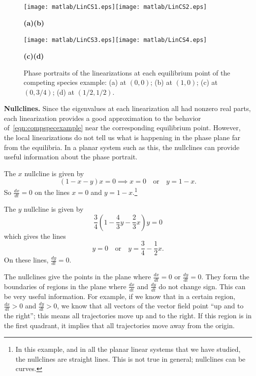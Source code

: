 \documentclass[reqno]{immbook}
\numberwithin{equation}{chapter}
\numberwithin{question}{section}
\numberwithin{theorem}{chapter}
\numberwithin{figure}{chapter}
\theoremstyle{definition}
\begin{document}

\begin{figure}
\centerline{\texttt{[image: matlab/LinCS1.eps]}\texttt{[image: matlab/LinCS2.eps]}}
\vspace{-0.2in}
\centerline{\hspace{0.2in}\textbf{(a)}\hspace{2.1in}\textbf{(b)}}
\centerline{\texttt{[image: matlab/LinCS3.eps]}\texttt{[image: matlab/LinCS4.eps]}}
\vspace{-0.2in}
\centerline{\hspace{0.2in}\textbf{(c)}\hspace{2.1in}\textbf{(d)}}
\caption{Phase portraits of the linearizations at each equilibrium point
of the competing species example:
(a) at $(0,0)$; (b) at $(1,0)$; (c) at $(0,3/4)$; (d) at $(1/2,1/2)$.}
\label{fig:CompSpecLinPlots}
\end{figure}


\noindent
\textbf{Nullclines.}
Since the eigenvalues at each linearization
all had nonzero real parts, each linearization
provides a good approximation to the behavior
of~\eqref{eqn:compspecexample} near the corresponding
equilibrium point.
However, the local linearizations do not tell us what is
happening in the phase plane far from the equilibria.
In a planar system such as this, the nullclines
can provide useful information about the phase portrait.

The $x$ nullcline is given by
\begin{equation}
   (1-x-y)x = 0 \implies x=0 \quad\textrm{or}\quad y = 1-x.
\end{equation}
So $\frac{dx}{dt}=0$ on the lines $x=0$
and $y=1-x$.\footnote{In this example, and in all
the planar linear systems that we have studied,
the nullclines are straight lines. This is not true in general;
nullclines can be curves.}

The $y$ nullcline is given by
\begin{equation}
  \frac{3}{4}\left(1-\frac{4}{3}y - \frac{2}{3} x\right)y = 0
\end{equation}
which gives the lines
\begin{equation}
  y = 0 \quad \textrm{or} \quad y = \frac{3}{4} - \frac{1}{2}x.
\end{equation}
On these lines, $\frac{dy}{dt}=0$.

The nullclines give the points in the plane where 
$\frac{dx}{dt}=0$ or $\frac{dy}{dt}=0$.
They form the boundaries of regions in the plane
where $\frac{dx}{dt}$ and $\frac{dy}{dt}$ do not change sign.
This can be very useful information.
For example, if we know that in a certain region,
$\frac{dx}{dt} > 0$ and $\frac{dy}{dt}>0$, we know that all
vectors of the vector field point ``up and to the right'';
this means all trajectories move up and to the right.
If this region is in the first quadrant, it implies that
all trajectories move away from the origin.
\end{document}
